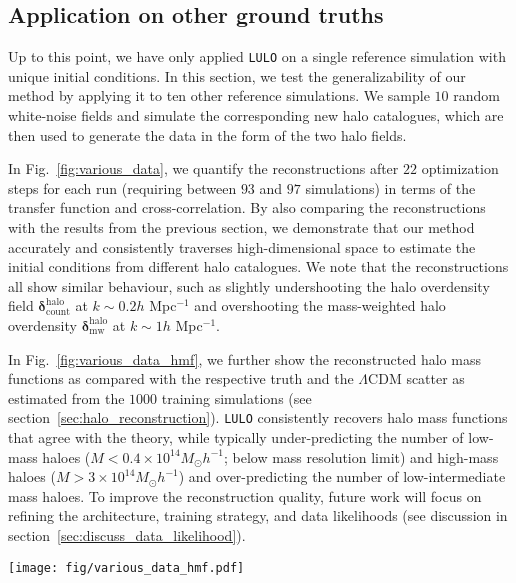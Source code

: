 \subsection{Application on other ground truths }
\label{sec:various_data}

Up to this point, we have only applied \texttt{LULO} on a single reference simulation with unique initial conditions. In this section, we test the generalizability of our method by applying it to ten other reference simulations. We sample $10$ random white-noise fields and simulate the corresponding new halo catalogues, which are then used to generate the data in the form of the two halo fields. 

In Fig.~\ref{fig:various_data}, we quantify the reconstructions after $22$ optimization steps for each run (requiring between $93$ and $97$ simulations) in terms of the transfer function and cross-correlation. By also comparing the reconstructions with the results from the previous section, we demonstrate that our method accurately and consistently traverses high-dimensional space to estimate the initial conditions from different halo catalogues. We note that the reconstructions all show similar behaviour, such as slightly undershooting the halo overdensity field $\boldsymbol{\delta}_{\mathrm{count}}^{\mathrm{halo}}$ at $k \sim 0.2h$ Mpc$^{-1}$ and overshooting the mass-weighted halo overdensity $\boldsymbol{\delta}_{\mathrm{mw}}^{\mathrm{halo}}$ at $k \sim 1h$ Mpc$^{-1}$. 

In Fig.~\ref{fig:various_data_hmf}, we further show the reconstructed halo mass functions as compared with the respective truth and the $\Lambda$CDM scatter as estimated from the $1000$ training simulations (see section~\ref{sec:halo_reconstruction}). \texttt{LULO} consistently recovers halo mass functions that agree with the theory, while typically under-predicting the number of low-mass haloes ($M<0.4\times 10^{14}M_{\odot}h^{-1}$; below mass resolution limit) and high-mass haloes ($M>3\times10^{14}M_{\odot}h^{-1}$) and over-predicting the number of low-intermediate mass haloes. To improve the reconstruction quality, future work will focus on refining the architecture, training strategy, and data likelihoods (see discussion in section~\ref{sec:discuss_data_likelihood}). 

\begin{figure*}
    \centering
    \texttt{[image: fig/various\_data\_hmf.pdf]}
    \caption{Reconstructions of the halo mass function using different ground truth data. The method tends to predict fewer low- and high-mass haloes and a higher number of intermediate-sized haloes than the respective ground truths. In most optimizations and for most masses, the final halo mass function agrees with the underlying theory prediction of $\Lambda$CDM (yellow band) above the mass resolution limit (red band).}
    \label{fig:various_data_hmf}
\end{figure*}